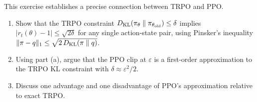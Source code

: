 \begin{exercise}[Challenge]
\label{ex:trpo-ppo-connection}
This exercise establishes a precise connection between TRPO and PPO.
\begin{enumerate}[label=(\alph*)]
  \item Show that the TRPO constraint
    $D_{\mathrm{KL}}\!\left(\pi_\theta\;\|\;\pi_{\theta_\mathrm{old}}\right) \leq \delta$
    implies $|r_t(\theta) - 1| \leq \sqrt{2\delta}$ for any single
    action-state pair, using Pinsker's inequality
    $\|\pi - q\|_1 \leq \sqrt{2\,D_{\mathrm{KL}}\!\left(\pi\;\|\;q\right)}$.
  \item Using part (a), argue that the PPO clip at $\varepsilon$ is
    a first-order approximation to the TRPO KL constraint with
    $\delta \approx \varepsilon^2/2$.
  \item Discuss one advantage and one disadvantage of PPO's approximation
    relative to exact TRPO.
\end{enumerate}
\end{exercise}
